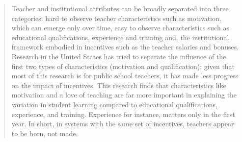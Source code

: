 \documentclass[12pt]{article}
\begin{document}
\begin{quotation}
Teacher and institutional attributes can be broadly separated into three categories: hard to observe teacher characteristics such as motivation, which can emerge only over time, easy to observe characteristics such as educational qualifications, experience and training and, the institutional framework embodied in incentives such as the teacher salaries and bonuses. Research in the United States has tried to separate the influence of the first two types of characteristics (motivation and qualification); given that most of this research is for public school teachers, it has made less progress on the impact of incentives. This research finds that characteristics like motivation and a love of teaching are far more important in explaining the variation in student learning compared to educational qualifications, experience, and training. Experience for instance, matters only in the first year. In short, in systems with the same set of incentives, teachers appear to be born, not made.\citep[p. 78]{Andrabi:2007we}
\end{quotation}
\end{document}
